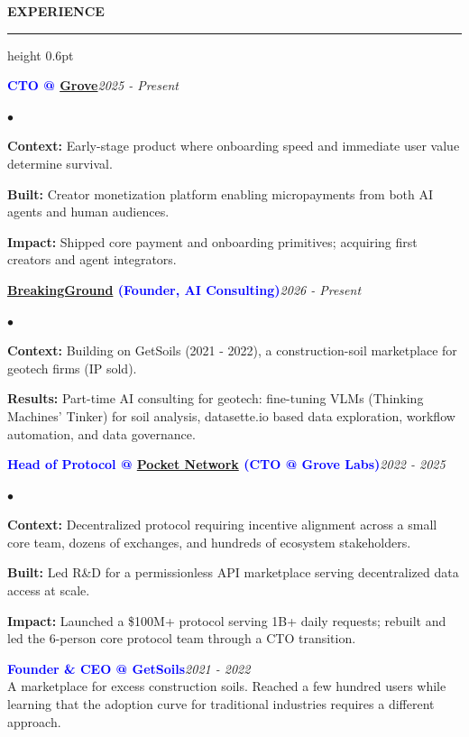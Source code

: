 \documentclass[10pt]{resume}
\newenvironment{rSectionCompact}[1]{
  \smallskip
  \vspace{0.1em}
  \textbf{\textcolor{Cerulean}{\MakeUppercase{#1}}}
  \vspace{0.2em}
  {\color{Blue}\hrule height 0.6pt}
  \vspace{0.6em}
  \begin{list}{}{
    \setlength{\leftmargin}{0em}
  }
  \item[]
}{
    \vspace{0.15em}
    \end{list}
}
\newenvironment{rJobCompact}[2]{
  \normalsize
  \textcolor{Blue}{\textbf{#1}}\hfill\textit{#2}
  \vspace{0.05em}
  \begin{list}{$\bullet$}{
    \setlength{\leftmargin}{1.6em}
    \setlength{\itemsep}{-0.1em}
    \setlength{\topsep}{0pt}
    \setlength{\partopsep}{0pt}
    \setlength{\parsep}{0pt}
  }
}{
    \end{list}
    \vspace{0.35em}
}
\begin{document}

\begin{rSectionCompact}{Experience}

    \begin{rJobCompact}{CTO @ \href{https://grove.city}{Grove}}{2025 - Present}
        \item \textbf{Context:} Early-stage product where onboarding speed and immediate user value determine survival.
        \item \textbf{Built:} Creator monetization platform enabling micropayments from both AI agents and human audiences.
        \item \textbf{Impact:} Shipped core payment and onboarding primitives; acquiring first creators and agent integrators.
    \end{rJobCompact}

    \begin{rJobCompact}{\href{https://breakingground.tech}{BreakingGround} (Founder, AI Consulting)}{2026 - Present}
        \item \textbf{Context:} Building on GetSoils (2021 - 2022), a construction-soil marketplace for geotech firms (IP sold).
        \item \textbf{Results:} Part-time AI consulting for geotech: fine-tuning VLMs (Thinking Machines' Tinker) for soil analysis, datasette.io based data exploration, workflow automation, and data governance.
    \end{rJobCompact}

    \begin{rJobCompact}{Head of Protocol @ \href{https://pokt.network}{Pocket Network} (CTO @ Grove Labs)}{2022 - 2025}
        \item \textbf{Context:} Decentralized protocol requiring incentive alignment across a small core team, dozens of exchanges, and hundreds of ecosystem stakeholders.
        \item \textbf{Built:} Led R\&D for a permissionless API marketplace serving decentralized data access at scale.
        \item \textbf{Impact:} Launched a \$100M+ protocol serving 1B+ daily requests; rebuilt and led the 6-person core protocol team through a CTO transition.
    \end{rJobCompact}

    \textcolor{Blue}{\textbf{Founder \& CEO @ GetSoils}}\hfill\textit{2021 - 2022} \\
    A marketplace for excess construction soils. Reached a few hundred users while learning that the adoption curve for traditional industries requires a different approach.
    \vspace{0.35em}


\end{rSectionCompact}
\end{document}
